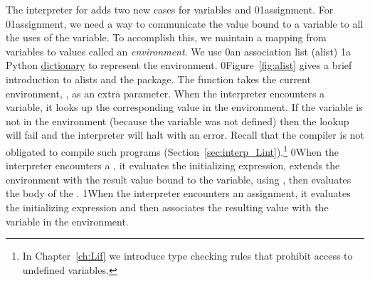\documentclass[7x10]{TimesAPriori_MIT}%
\def\racketEd{0}
\def\pythonEd{1}
\providecommand{\BookEdition}{1}
\let\edition\BookEdition
\newcommand{\racket}[1]{{\if\edition\racketEd{#1}\fi}}
\newcommand{\pythonColor}[0]{}
\newcommand{\python}[1]{{\if\edition\pythonEd\pythonColor #1\fi}}
\numberwithin{theorem}{chapter}
\numberwithin{definition}{chapter}
\numberwithin{equation}{chapter}
\begin{document}
The interpreter for \LangVar{} adds two new cases for
variables and \racket{}\python{assignment}. For
\racket{}\python{assignment}, we need a way to communicate the
value bound to a variable to all the uses of the variable. To
accomplish this, we maintain a mapping from variables to values called
an \emph{environment}.
%
We use
%
\racket{an association list (alist) }%
%
\python{a Python \href{https://docs.python.org/3.10/library/stdtypes.html\#mapping-types-dict}{dictionary} }%
%
to represent the environment.
%
\racket{Figure~\ref{fig:alist} gives a brief introduction to alists
  and the \code{racket/dict} package.}
%
The  function takes the current environment,
, as an extra parameter.  When the interpreter encounters a
variable, it looks up the corresponding value in the environment. If
the variable is not in the environment (because the variable was not
defined) then the lookup will fail and the interpreter will
halt with an error. Recall that the compiler is not obligated to
compile such programs (Section~\ref{sec:interp_Lint}).\footnote{In
  Chapter~\ref{ch:Lif} we introduce type checking rules that
  prohibit access to undefined variables.}
%
\racket{When the interpreter encounters a , it evaluates the
  initializing expression, extends the environment with the result
  value bound to the variable, using \code{dict-set}, then evaluates
  the body of the \key{Let}.}
%
\python{When the interpreter encounters an assignment, it evaluates
   the initializing expression and then associates the resulting value
   with the variable in the environment.}
\end{document}
